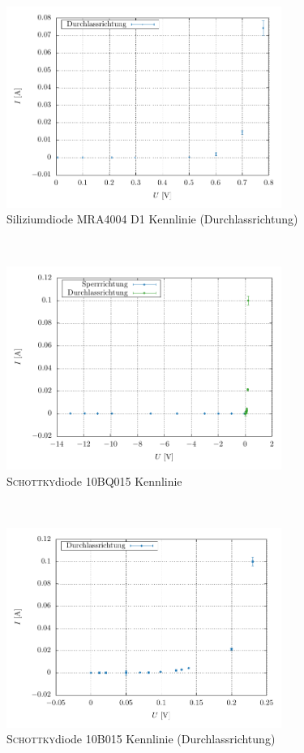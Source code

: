 \documentclass[a4paper,10pt]{article}
\numberwithin{equation}{section}
\begin{document}
\begin{figure}[h]
        \centering
        \includegraphics[width=0.8\textwidth]{plot/D1_durchlass_crop.pdf}
        \caption{Siliziumdiode MRA4004 D1 Kennlinie (Durchlassrichtung)}
\end{figure}\\
\begin{figure}[h]
        \centering
        \includegraphics[width=0.8\textwidth]{plot/D2_crop.pdf}
        \caption{\textsc{Schottky}diode 10BQ015 Kennlinie}
\end{figure}\\
\begin{figure}[h]
        \centering
        \includegraphics[width=0.8\textwidth]{plot/D2_durchlass_crop.pdf}
        \caption{\textsc{Schottky}diode 10B015 Kennlinie (Durchlassrichtung)}
\end{figure}\\
\end{document}

